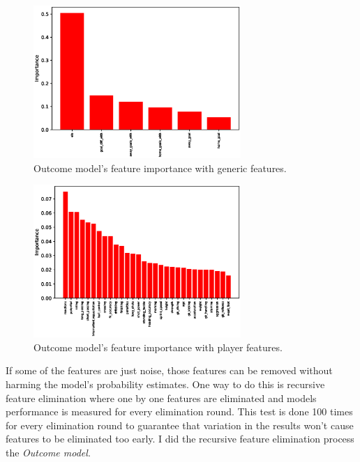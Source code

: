 \begin{figure}[H]
    \centering
    \includegraphics[width=0.7\textwidth]{img/match_level_2018_outcome_feature_importance_gf_feature_importance.eps}
    \caption{Outcome model's feature importance with generic features.}
    \label{fig:outcome_feature_importance_gf}
\end{figure}

\begin{figure}[H]
    \centering
    \includegraphics[width=0.7\textwidth]{img/match_level_2018_outcome_feature_importance_pf_feature_importance.eps}
    \caption{Outcome model's feature importance with player features.}
    \label{fig:outcome_feature_importance_pf}
\end{figure}

If some of the features are just noise, those features can be removed without harming the model's probability estimates. One way to do this is recursive feature elimination where one by one features are eliminated and models performance is measured for every elimination round. This test is done 100 times for every elimination round to guarantee that variation in the results won't cause features to be eliminated too early. I did the recursive feature elimination process the \textit{Outcome model}.

